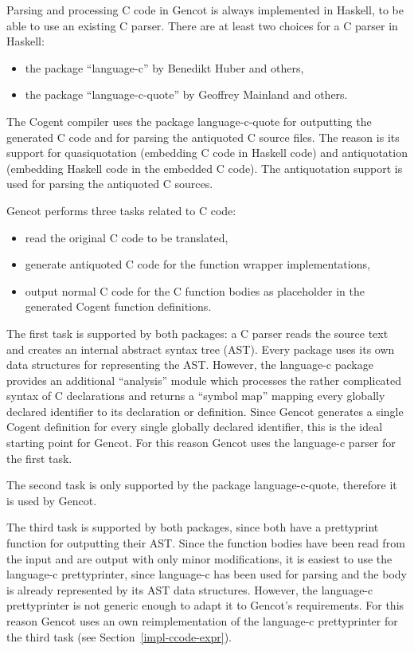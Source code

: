 
Parsing and processing C code in Gencot is always implemented in Haskell, to be able to use an existing
C parser. There are at least two choices for a C parser in Haskell:
\begin{itemize}
\item the package ``language-c'' by Benedikt Huber and others,
\item the package ``language-c-quote'' by Geoffrey Mainland and others.
\end{itemize}

The Cogent compiler uses the package language-c-quote for outputting the generated C code and for parsing the antiquoted
C source files. The reason is its support for quasiquotation (embedding C code in Haskell code) and antiquotation
(embedding Haskell code in the embedded C code). The antiquotation support is used for parsing the antiquoted C sources.

Gencot performs three tasks related to C code:
\begin{itemize}
\item read the original C code to be translated,
\item generate antiquoted C code for the function wrapper implementations,
\item output normal C code for the C function bodies as placeholder in the generated Cogent function definitions.
\end{itemize}

The first task is supported by both packages: a C parser reads the source text and creates an internal abstract syntax tree (AST).
Every package uses its own data structures for representing the AST. However, the language-c package provides an additional
``analysis'' module which processes the rather complicated syntax of C declarations and returns a ``symbol map'' mapping
every globally declared identifier to its declaration or definition. Since Gencot generates a single Cogent definition for
every single globally declared identifier, this is the ideal starting point for Gencot. For this reason Gencot uses
the language-c parser for the first task.

The second task is only supported by the package language-c-quote, therefore it is used by Gencot. 

The third task is supported by both packages, since both have a prettyprint function for outputting their AST. Since the 
function bodies have been read from the input and are output with only minor modifications, it is easiest to use
the language-c prettyprinter, since language-c has been used for parsing and the body is already represented by its 
AST data structures. However, the language-c prettyprinter is not generic enough to adapt it to Gencot's requirements.
For this reason Gencot uses an own reimplementation of the language-c prettyprinter for the third task (see 
Section~\ref{impl-ccode-expr}).

